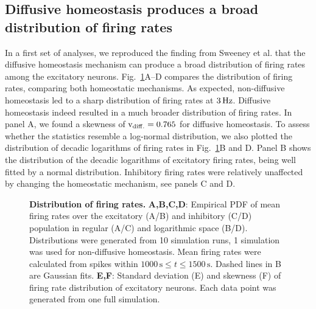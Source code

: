 \documentclass[10pt,letterpaper]{article}
\begin{document}
\subsection*{Diffusive homeostasis produces a broad distribution of firing rates}\label{Fir_Dist_Section}
In a first set of analyses, we reproduced the finding from Sweeney et al. \cite{Sweeney_Paper} that the diffusive homeostasis mechanism can produce a broad distribution of firing rates among the excitatory neurons. Fig.~\ref{Fir_Rate_Dist_Comp}A--D compares the distribution of firing rates, comparing both homeostatic mechanisms. As expected, non-diffusive homeostasis led to a sharp distribution of firing rates at $\rm 3\, Hz$. Diffusive homeostasis indeed resulted in a much broader distribution of firing rates. In panel A, we found a skewness of $\mathrm{v_{\rm diff.} = 0.765}$ for diffusive homeostasis. To assess whether the statistics resemble a log-normal distribution, we also plotted the distribution of decadic logarithms of firing rates in Fig.~\ref{Fir_Rate_Dist_Comp}B and D. Panel B shows the distribution of the decadic logarithms of excitatory firing rates, being well fitted by a normal distribution. Inhibitory firing rates were relatively unaffected by changing the homeostatic mechanism, see panels C and D.  

\begin{figure}
\begin{center}
\end{center}
\caption{{\bf Distribution of firing rates.} \textbf{A,B,C,D}: Empirical PDF of mean firing rates over the excitatory (A/B) and inhibitory (C/D) population in regular (A/C) and logarithmic space (B/D). Distributions were generated from 10 simulation runs, 1 simulation was used for non-diffusive homeostasis. Mean firing rates were calculated from spikes within $\mathrm{1000\,s} \leq t  \mathrm{\leq 1500\,s}$. Dashed lines in B are Gaussian fits. \textbf{E,F}: Standard deviation (E) and skewness (F) of firing rate distribution of excitatory neurons. Each data point was generated from one full simulation.}
\label{Fir_Rate_Dist_Comp}
\end{figure}
\end{document}

